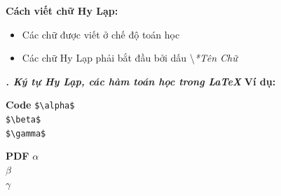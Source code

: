 \documentclass[11pt]{beamer}
\newcounter{group}
\begin{document}
	\begin{frame}
		\begin{block}{\textbf{Cách viết chữ Hy Lạp:}}
			\begin{itemize}
				\pause
				\item Các chữ được viết ở chế độ toán học
				\pause
				\item Các chữ Hy Lạp phải bắt đầu bởi dấu \textbackslash \textit{*Tên Chữ}
			\end{itemize}
		\end{block}
	\end{frame}
	\begin{frame}[fragile]{\textbf{\textit{\thegroup. Ký tự Hy Lạp, các hàm toán học trong \LaTeX}}}
		\textbf{Ví dụ:}
		\begin{block}{\textbf{Code}}
			\verb*|$\alpha$|\\ 
			\verb*|$\beta$|\\
			\verb*|$\gamma$|
		\end{block}

		\begin{block}{\textbf{PDF}}
			$\alpha$\\
			$\beta$\\
			$\gamma$
		\end{block}
	\end{frame}
\end{document}
